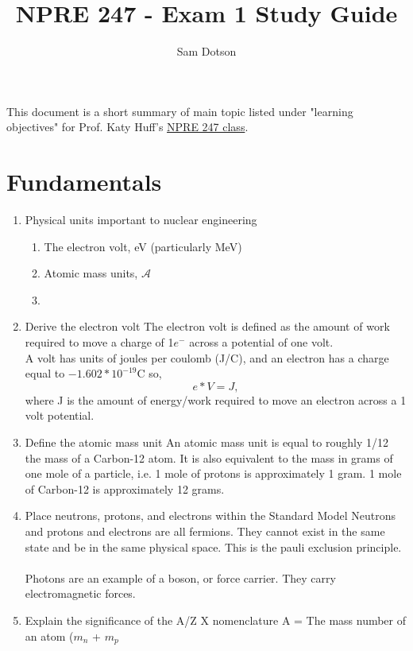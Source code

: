 \documentclass{article}
\author{Sam Dotson}
\title{NPRE 247 - Exam 1 Study Guide}
\begin{document}
\maketitle

This document is a short summary of main topic listed under "learning objectives" for Prof. Katy Huff's 
\href{https://github.com/katyhuff/npre247}{NPRE 247 class}.

\section{Fundamentals}

\begin{enumerate}
	\item{Physical units important to nuclear engineering}
		\begin{enumerate}
			\item{The electron volt, eV (particularly MeV)}
			\item{Atomic mass units, $\mathcal{A}$}
			\item{}
		\end{enumerate}
	\item{Derive the electron volt}
		The electron volt is defined as the amount of work required to move a charge of 1$e^{-}$ across a potential of one volt. \\
		A volt has units of joules per coulomb (J/C), and an electron has a charge equal to $-1.602*10^{-19}$C so, 
		\begin{equation}
			e * V  = J,
		\end{equation}
		where J is the amount of energy/work required to move an electron across a 1 volt potential. 
	\item{Define the atomic mass unit}
		An atomic mass unit is equal to roughly 1/12 the mass of a Carbon-12 atom. It is also equivalent to the mass in grams of one mole of a particle, i.e. 1 mole of protons is approximately 1 gram. 1 mole of Carbon-12 is approximately 12 grams. 
	\item{Place neutrons, protons, and electrons within the Standard Model}
		Neutrons and protons and electrons are all fermions. They cannot exist in the same state and be in the same physical space. This is the pauli exclusion principle. \\\\
		Photons are an example of a boson, or force carrier. They carry electromagnetic forces.
	\item{Explain the significance of the A/Z X nomenclature}
		A = The mass number of an atom ($m_{n}$ + $m_{p}$\\

\end{enumerate}
\end{document}
